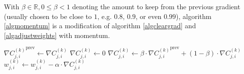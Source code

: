 \documentclass[titlepage]{article}
\begin{document}
        With $\beta \in \mathbb{R}, 0 \leq \beta < 1$ denoting the amount to
        keep from the previous gradient (usually chosen to be close to $1$, e.g.
        $0.8$, $0.9$, or even $0.99$), algorithm \ref{algmomentum} is a
        modification of algorithm \ref{algcleargrad} and \ref{algadjustweights}
        with momentum.

        \begin{algorithm}
          \caption{%
            Modified version of algorithm \ref{algcleargrad} and
            \ref{algadjustweights} with momentum.
          } \label{algmomentum}
          \begin{algorithmic}
                    \State $
                      {\nabla C_{j,i}^{(k)}}^\text{prev} \gets
                        \nabla C_{j,i}^{(k)}
                    $
                    \State $\nabla C_{j,i}^{(k)} \gets 0$
                  \EndFor
                \EndFor
              \EndFor
            \EndProcedure
                    \State $
                      \nabla C_{j,i}^{(k)} \gets
                        \beta \cdot {\nabla C_{j,i}^{(k)}}^\text{prev}
                        +
                        \left( 1 - \beta \right) \cdot \nabla C_{j,i}^{(k)}
                    $
                    \State $
                      w_{j,i}^{(k)} \gets
                        w_{j,i}^{(k)} - \alpha \cdot \nabla C_{j,i}^{(k)}
                    $
                  \EndFor
                \EndFor
              \EndFor
            \EndProcedure
          \end{algorithmic}
        \end{algorithm}
\end{document}
